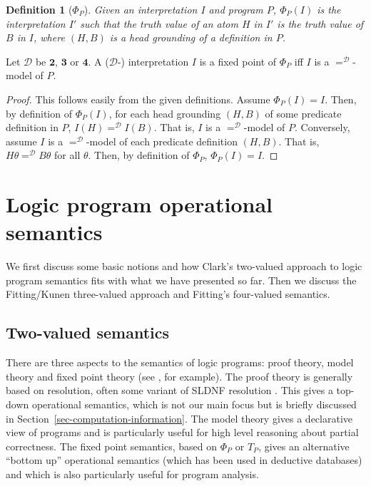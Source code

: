 \documentclass{tlp}
\newtheorem{definition}{Definition}
\newcommand{\Bi}{\ensuremath{\mathbf{2}}}
\newcommand{\Tri}{\ensuremath{\mathbf{3}}}
\newcommand{\Quad}{\ensuremath{\mathbf{4}}}
\begin{document}
\begin{definition}[$\Phi_P$] \rm
Given an interpretation $I$ and program $P$, $\Phi_P(I)$ is the
interpretation $I'$ such that the truth value of an atom $H$ in $I'$ is
the truth value of $B$ in $I$, where $(H,B)$ is a head grounding of a
definition in $P$.
\end{definition}


\begin{proposition} \rm
Let $\mathcal{D}$ be $\Bi$, $\Tri$ or $\Quad$.
A ($\mathcal{D}$-) interpretation $I$ is a fixed point of $\Phi_P$ 
iff $I$ is a $=^{\mathcal{D}}$-model of $P$.
\end{proposition}
\begin{proof}
This follows easily from the given definitions.
Assume $\Phi_P(I) = I$.
Then, by definition of $\Phi_P(I)$, for each head grounding $(H,B)$
of some predicate definition in $P$, $I(H) =^{\mathcal{D}} I(B)$.
That is, $I$ is a $=^{\mathcal{D}}$-model of $P$.
Conversely, assume $I$ is a $=^{\mathcal{D}}$-model of each predicate
definition $(H,B)$.
That is, $H\theta =^{\mathcal{D}} B\theta$ for all $\theta$.
Then, by definition of $\Phi_P$, $\Phi_P(I) = I$.
\end{proof}


\section{Logic program operational semantics}
\label{sec-lp-semantics}

We first discuss some basic notions and how Clark's two-valued approach
to logic program semantics fits with what we have presented so far.
Then we discuss the Fitting/Kunen three-valued approach and Fitting's
four-valued semantics.

\subsection{Two-valued semantics}
\label{sec-clark}

There are three aspects to the semantics of logic programs: proof
theory, model theory and fixed point theory (see ,
for example).  The proof theory is generally based on resolution,
often some variant of SLDNF resolution \cite{Cla78}.  This gives a
top-down operational semantics, which is not our main focus but is
briefly discussed in Section~\ref{sec-computation-information}.
The model theory gives a declarative view of programs and is particularly
useful for high level reasoning about partial correctness.  The fixed
point semantics, based on $\Phi_P$ or $T_P$, gives an alternative 
``bottom up'' operational semantics (which has been used in deductive
databases) and which is also particularly useful for program analysis.
\end{document}

